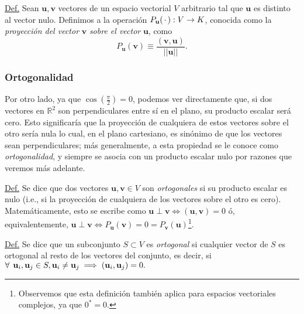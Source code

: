 \documentclass[12pt]{article}
\begin{document}
\begin{tcolorbox}
    \underline{Def.} Sean $\mathbf{u},\mathbf{v}$ vectores de un espacio vectorial $V$ arbitrario tal que $\mathbf{u}$ es distinto al vector nulo. Definimos a la operación $P_{\mathbf{u}}(\hspace{0.5mm}\cdot\hspace{0.5mm} ):V\to K$, conocida como la \emph{proyección del vector} $\mathbf{v}$ \emph{sobre el vector} $\mathbf{u}$, como \[
        P_{\mathbf{u}}(\mathbf{v}) \equiv \frac{(\mathbf{v},\mathbf{u})}{||\mathbf{u}||}
    .\]
\end{tcolorbox}

\subsubsection{Ortogonalidad}

Por otro lado, ya que $\cos(\frac{\pi}{2})=0$, podemos ver directamente que, si dos vectores en $\mathbb{R}^2$ son perpendiculares entre sí en el plano, su producto escalar será cero. Esto significaría que la proyección de cualquiera de estos vectores sobre el otro sería nula \textemdash lo cual, en el plano cartesiano, es sinónimo de que los vectores sean perpendiculares\textemdash \hspace{0.5mm}; más generalmente, a esta propiedad se le conoce como \emph{ortogonalidad}, y siempre se asocia con un producto escalar nulo por razones que veremos más adelante.

\vspace{2mm}

\begin{tcolorbox} \label{Def:Vectores_ortogonales_y_subconjunto_ortogonal}
    \underline{Def.} Se dice que dos vectores $\mathbf{u}, \mathbf{v}\in V$ son \emph{ortogonales} si su producto escalar es nulo (i.e., si la proyección de cualquiera de los vectores sobre el otro es cero). Matemáticamente, esto se escribe como $\mathbf{u}\perp\mathbf{v}\iff(\mathbf{u},\mathbf{v})=0$ \hspace{0.5mm} ó, equivalentemente, $\mathbf{u}\perp\mathbf{v}\iff P_{\mathbf{u}}(\mathbf{v})=0=P_{\mathbf{v}}(\mathbf{u})$\footnote{Observemos que esta definición también aplica para espacios vectoriales complejos, ya que $0^*=0$.}.

    \vspace{3mm} 

    \underline{Def.} Se dice que un subconjunto $S\subset V$ es \emph{ortogonal} si cualquier vector de $S$ es ortogonal al resto de los vectores del conjunto, es decir, si $\forall\hspace{1.5mm} \mathbf{u}_i, \mathbf{u}_j\in S, \mathbf{u}_i\neq\mathbf{u}_j\implies (\mathbf{u}_i,\mathbf{u}_j)=0.$
\end{tcolorbox}
\end{document}
